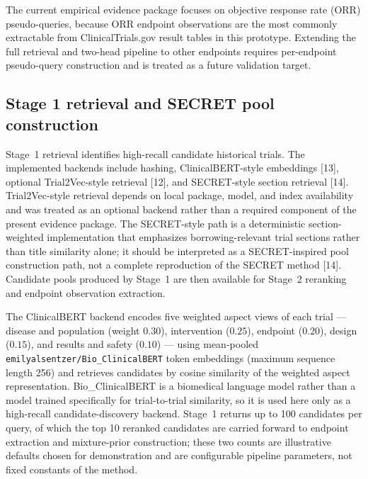 \documentclass[11pt]{article}
\begin{document}
The current empirical evidence package focuses on objective response rate
(ORR) pseudo-queries, because ORR endpoint observations are the most commonly
extractable from ClinicalTrials.gov result tables in this prototype. Extending
the full retrieval and two-head pipeline to other endpoints requires
per-endpoint pseudo-query construction and is treated as a future validation
target.

\subsection{Stage 1 retrieval and SECRET pool construction}
Stage~1 retrieval identifies high-recall candidate historical trials. The
implemented backends include hashing, ClinicalBERT-style embeddings [13],
optional Trial2Vec-style retrieval [12], and SECRET-style section retrieval
[14]. Trial2Vec-style
retrieval depends on local package, model, and index availability and was
treated as an optional backend rather than a required component of the present
evidence package. The SECRET-style path is a deterministic section-weighted
implementation that emphasizes borrowing-relevant trial sections rather than
title similarity alone; it should be interpreted as a SECRET-inspired pool
construction path, not a complete reproduction of the SECRET method [14]. Candidate
pools produced by Stage~1 are then available for Stage~2 reranking and
endpoint observation extraction.

The ClinicalBERT backend encodes five weighted aspect views of each trial ---
disease and population (weight $0.30$), intervention ($0.25$), endpoint
($0.20$), design ($0.15$), and results and safety ($0.10$) --- using
mean-pooled \texttt{emilyalsentzer/Bio\_ClinicalBERT} token embeddings
(maximum sequence length 256) and retrieves candidates by cosine similarity of
the weighted aspect representation. Bio\_ClinicalBERT is a biomedical language
model rather than a model trained specifically for trial-to-trial similarity,
so it is used here only as a high-recall candidate-discovery backend. Stage~1
returns up to 100 candidates per query, of which the top 10 reranked candidates
are carried forward to endpoint extraction and mixture-prior construction; these
two counts are illustrative defaults chosen for demonstration and are
configurable pipeline parameters, not fixed constants of the method.
\end{document}
